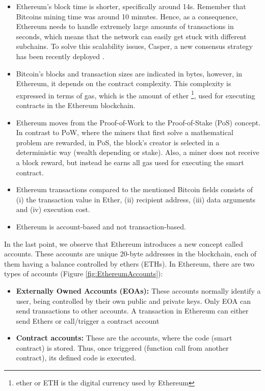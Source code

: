 \begin{itemize}
	
	\item Ethereum's block time is shorter, specifically around 14s. Remember that Bitcoins mining time was around 10 minutes. Hence, as a consequence, Ethereum needs to handle extremely large amounts of transactions in seconds, which means that the network can easily get stuck with different subchains. To solve this scalability issues, Casper, a new consensus strategy has been recently deployed \cite{proofOfStake}.

	\item Bitcoin's blocks and transaction sizes are indicated in bytes, however, in Ethereum, it depends on the contract complexity. This complexity is expressed in terms of gas, which is the amount of ether \footnote{ether or ETH is the digital currency used by Ethereum}, used for executing contracts in the Ethereum blockchain. 
	\item Ethereum moves from the Proof-of-Work to the Proof-of-Stake (PoS) concept. In contrast to PoW, where the miners that first solve a mathematical problem are rewarded, in PoS, the block's creator is selected in a deterministic way (wealth depending or stake). Also, a miner does not receive a block reward, but instead he earns all gas used for executing the smart contract.
	\item Ethereum transactions compared to the mentioned Bitcoin fields consists of (i) the transaction value in Ether, (ii) recipient address, (iii) data arguments and (iv) execution cost.
	\item Ethereum is account-based and not transaction-based.
\end{itemize}

In the last point, we observe that Ethereum introduces a new concept called accounts. These accounts are unique 20-byte addresses in the blockchain, each of them having a balance controlled by ethers (ETHs). In Ethereum, there are two types of accounts (Figure \ref{fig:EthereumAccounts}):

\begin{itemize}
	
	\item \textbf{Externally Owned Accounts (EOAs):} These accounts normally identify a user, being controlled by their own public and private keys. Only EOA can send transactions to other accounts. A transaction in Ethereum can either send Ethers or call/trigger a contract account  
	\item \textbf{Contract accounts:} These are the accounts, where the code (smart contract) is stored. Thus, once triggered (function call from another contract), its defined code is executed.
\end{itemize}

